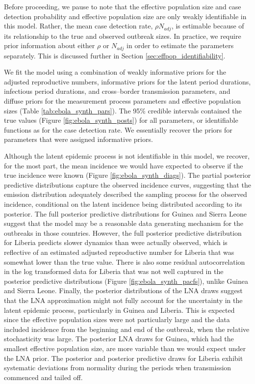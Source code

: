 Before proceeding, we pause to note that the effective population size and case detection probability and effective population size are only weakly identifiable in this model. Rather, the mean case detection rate, $ \rho N_{adj} $, is estimable because of its relationship to the true and observed outbreak sizes. In practice, we require prior information about either $ \rho $ or $ N_{adj} $ in order to estimate the parameters separately. This is discussed further in Section \ref{sec:effpop_identifiability}. 

We fit the model using a combination of weakly informative priors for the adjusted reproductive numbers, informative priors for the latent period durations, infectious period durations, and cross--border transmission parameters, and diffuse priors for the measurement process parameters and effective population sizes (Table \ref{tab:ebola_synth_pars}). The 95\% credible intervals contained the true values (Figure \ref{fig:ebola_synth_posts}) for all parameters, or identifiable functions as for the case detection rate. We essentially recover the priors for parameters that were assigned informative priors. 

Although the latent epidemic process is not identifiable in this model, we recover, for the most part, the mean incidence we would have expected to observe if the true incidence were known (Figure \ref{fig:ebola_synth_diags}). The partial posterior predictive distributions capture the observed incidence curves, suggesting that the emission distribution adequately described the sampling process for the observed incidence, conditional on the latent incidence being distributed according to its posterior. The full posterior predictive distributions for Guinea and Sierra Leone suggest that the model may be a reasonable data generating mechanism for the outbreaks in those countries. However, the full posterior predictive distribution for Liberia predicts slower dynamics than were actually observed, which is reflective of an estimated adjusted reproductive number for Liberia that was somewhat lower than the true value. There is also some residual autocorrelation in the log transformed data for Liberia that was not well captured in the posterior predictive distributions (Figure \ref{fig:ebola_synth_pacfs}), unlike Guinea and Sierra Leone. Finally, the posterior distributions of the LNA draws suggest that the LNA approximation might not fully account for the uncertainty in the latent epidemic process, particularly in Guinea and Liberia. This is expected since the effective population sizes were not particularly large and the data included incidence from the beginning and end of the outbreak, when the relative stochasticity was large. The posterior LNA draws for Guinea, which had the smallest effective population size, are more variable than we would expect under the LNA prior. The posterior and posterior predictive draws for Liberia exhibit systematic deviations from normality during the periods when transmission commenced and tailed off.


